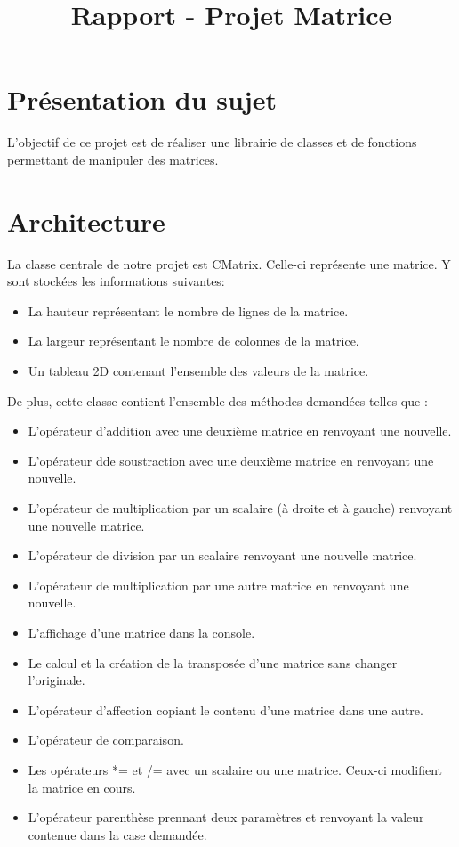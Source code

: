 
\title{Rapport - Projet Matrice}
\fancyhf{}
\lhead{\leftmark}


	\maketitle
	\tableofcontents
	\chapter{Présentation du sujet}
		L'objectif de ce projet est de réaliser une librairie de classes et de fonctions permettant de manipuler des matrices.
	
	\chapter{Architecture}
		La classe centrale de notre projet est CMatrix. Celle-ci représente une matrice. Y sont stockées les informations suivantes:
		\begin{itemize}
			\item La hauteur représentant le nombre de lignes de la matrice.
			\item La largeur représentant le nombre de colonnes de la matrice.
			\item Un tableau 2D contenant l'ensemble des valeurs de la matrice.
		\end{itemize}
		De plus, cette classe contient l'ensemble des méthodes demandées telles que :
		\begin{itemize}
			\item L'opérateur d'addition avec une deuxième matrice en renvoyant une nouvelle.
			\item L'opérateur dde soustraction avec une deuxième matrice en renvoyant une nouvelle.
			\item L'opérateur de multiplication par un scalaire (à droite et à gauche) renvoyant une nouvelle matrice.
			\item L'opérateur de division par un scalaire renvoyant une nouvelle matrice.
			\item L'opérateur de multiplication par une autre matrice en renvoyant une nouvelle.
			\item L'affichage d'une matrice dans la console.
			\item Le calcul et la création de la transposée d'une matrice sans changer l'originale.
			\item L'opérateur d'affection copiant le contenu d'une matrice dans une autre.
			\item L'opérateur de comparaison.
			\item Les opérateurs *= et /= avec un scalaire ou une matrice. Ceux-ci modifient la matrice en cours.
			\item L'opérateur parenthèse prennant deux paramètres et renvoyant la valeur contenue dans la case demandée.
		\end{itemize}
		
